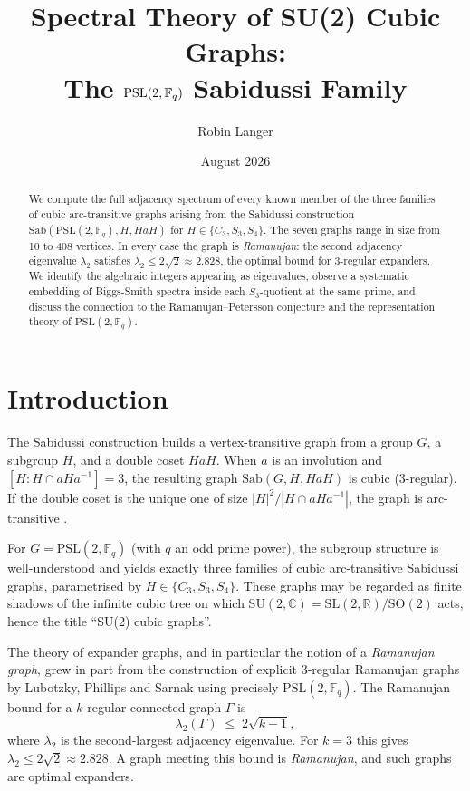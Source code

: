 \documentclass[11pt,a4paper]{amsart}
\title{Spectral Theory of SU(2) Cubic Graphs:\\
       The $\PSL{q}$ Sabidussi Family}
\author{Robin Langer}
\date{August 2026}
\theoremstyle{definition}
\theoremstyle{remark}
\newcommand{\PSL}[1]{\mathrm{PSL}(2,\mathbb{F}_{#1})}
\newcommand{\Sab}{\mathrm{Sab}}
\begin{document}
\maketitle

\begin{abstract}
We compute the full adjacency spectrum of every known member of the three
families of cubic arc-transitive graphs arising from the Sabidussi construction
$\Sab(\PSL{q}, H, HaH)$ for $H\in\{C_3, S_3, S_4\}$.  The seven graphs
range in size from 10 to 408 vertices.  In every case the graph is
\emph{Ramanujan}: the second adjacency eigenvalue $\lambda_2$ satisfies
$\lambda_2 \leq 2\sqrt{2} \approx 2.828$, the optimal bound for 3-regular
expanders.  We identify the algebraic integers appearing as eigenvalues,
observe a systematic embedding of Biggs-Smith spectra inside each
$S_3$-quotient at the same prime, and discuss the connection to the
Ramanujan--Petersson conjecture and the representation theory of
$\PSL{q}$.
\end{abstract}

\tableofcontents

\section{Introduction}

The Sabidussi construction \cite{Sabidussi1958} builds a vertex-transitive
graph from a group $G$, a subgroup $H$, and a double coset $HaH$.  When $a$ is
an involution and $[H : H\cap aHa^{-1}] = 3$, the resulting graph
$\Sab(G, H, HaH)$ is cubic (3-regular).  If the double coset is the unique
one of size $|H|^2/|H\cap aHa^{-1}|$, the graph is arc-transitive
\cite{Biggs1974}.

For $G = \PSL{q}$ (with $q$ an odd prime power), the subgroup structure is
well-understood and yields exactly three families of cubic arc-transitive
Sabidussi graphs, parametrised by $H \in \{C_3, S_3, S_4\}$.  These graphs
may be regarded as finite shadows of the infinite cubic tree on which
$\mathrm{SU}(2,\mathbb{C}) = \mathrm{SL}(2,\mathbb{R})/\mathrm{SO}(2)$ acts,
hence the title ``SU(2) cubic graphs''.

The theory of expander graphs, and in particular the notion of a
\emph{Ramanujan graph}, grew in part from the construction of explicit
3-regular Ramanujan graphs by Lubotzky, Phillips and Sarnak \cite{LPS1988}
using precisely $\PSL{q}$.  The Ramanujan bound for a $k$-regular connected
graph $\Gamma$ is
\[
  \lambda_2(\Gamma) \;\leq\; 2\sqrt{k-1},
\]
where $\lambda_2$ is the second-largest adjacency eigenvalue.  For $k=3$ this
gives $\lambda_2 \leq 2\sqrt{2} \approx 2.828$.  A graph meeting this bound is
\emph{Ramanujan}, and such graphs are optimal expanders.
\end{document}

